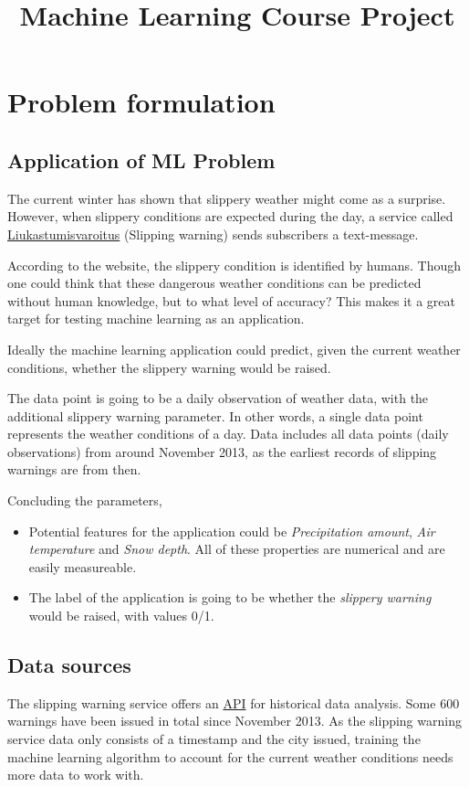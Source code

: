 \documentclass[12pt, a4paper]{report}
\title{Machine Learning Course Project}
\begin{document}
    \section{Problem formulation}
    \subsection{Application of ML Problem}
    The current winter has shown that slippery weather might come as a surprise.
    However, when slippery conditions are expected during the day, a service called \href{https://liukastumisvaroitus.fi/en/}{Liukastumisvaroitus} (Slipping warning) sends subscribers a text-message.

    According to the website, the slippery condition is identified by humans.
    Though one could think that these dangerous weather conditions can be predicted without 
    human knowledge, but to what level of accuracy? This makes it a great target for testing machine learning as an application.
    
    Ideally the machine learning application could predict, given the current weather conditions, whether the slippery warning would be raised.

    The data point is going to be a daily observation of weather data, with the additional
    slippery warning parameter. In other words, a single data point represents the weather conditions of a day. Data includes all data points (daily observations) from around 
    November 2013, as the earliest records of slipping warnings are from then.

    Concluding the parameters, 
    \begin{itemize}
      \item Potential features for the application could be \textit{Precipitation amount}, \textit{Air temperature} and \textit{Snow depth}. All of these properties are numerical and are easily measureable.
      \item The label of the application is going to be whether the \textit{slippery warning} would be raised, with values 0/1.
    \end{itemize}
    

    \subsection{Data sources}
    The slipping warning service offers an \href{https://liukastumisvaroitus-api.beze.io/api/v1/warnings/}{API} for historical data analysis. Some 600 warnings have been issued in total  since November 2013.
    As the slipping warning service data only consists of a timestamp and the city issued, training the machine learning algorithm to account for the current weather conditions needs more data to work with.
\end{document}
